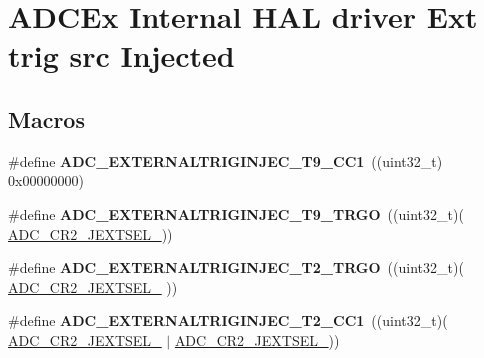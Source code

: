\hypertarget{group___a_d_c_ex___internal___h_a_l__driver___ext__trig__src___injected}{\section{A\-D\-C\-Ex Internal H\-A\-L driver Ext trig src Injected}
\label{group___a_d_c_ex___internal___h_a_l__driver___ext__trig__src___injected}
}
\subsection*{Macros}
\begin{DoxyCompactItemize}
\item 
\hypertarget{group___a_d_c_ex___internal___h_a_l__driver___ext__trig__src___injected_ga105db1d13dd9820bd7e65577433f1f17}{\#define {\bfseries A\-D\-C\-\_\-\-E\-X\-T\-E\-R\-N\-A\-L\-T\-R\-I\-G\-I\-N\-J\-E\-C\-\_\-\-T9\-\_\-\-C\-C1}~((uint32\-\_\-t) 0x00000000)}\label{group___a_d_c_ex___internal___h_a_l__driver___ext__trig__src___injected_ga105db1d13dd9820bd7e65577433f1f17}

\item 
\hypertarget{group___a_d_c_ex___internal___h_a_l__driver___ext__trig__src___injected_ga97742e007b1184da1487baadc14e1475}{\#define {\bfseries A\-D\-C\-\_\-\-E\-X\-T\-E\-R\-N\-A\-L\-T\-R\-I\-G\-I\-N\-J\-E\-C\-\_\-\-T9\-\_\-\-T\-R\-G\-O}~((uint32\-\_\-t)(                                                         \hyperlink{group___peripheral___registers___bits___definition_gaa70c1f30e2101e2177ce564440203ba3}{A\-D\-C\-\_\-\-C\-R2\-\_\-\-J\-E\-X\-T\-S\-E\-L\-\_}))}\label{group___a_d_c_ex___internal___h_a_l__driver___ext__trig__src___injected_ga97742e007b1184da1487baadc14e1475}

\item 
\hypertarget{group___a_d_c_ex___internal___h_a_l__driver___ext__trig__src___injected_gaf55019cfc1f565b459d2969a35d53c30}{\#define {\bfseries A\-D\-C\-\_\-\-E\-X\-T\-E\-R\-N\-A\-L\-T\-R\-I\-G\-I\-N\-J\-E\-C\-\_\-\-T2\-\_\-\-T\-R\-G\-O}~((uint32\-\_\-t)(                                      \hyperlink{group___peripheral___registers___bits___definition_ga99fa4a240d34ce231d6d0543bac7fd9b}{A\-D\-C\-\_\-\-C\-R2\-\_\-\-J\-E\-X\-T\-S\-E\-L\-\_}                   ))}\label{group___a_d_c_ex___internal___h_a_l__driver___ext__trig__src___injected_gaf55019cfc1f565b459d2969a35d53c30}

\item 
\hypertarget{group___a_d_c_ex___internal___h_a_l__driver___ext__trig__src___injected_ga949d65bba1c4763029803fa4a06b0a92}{\#define {\bfseries A\-D\-C\-\_\-\-E\-X\-T\-E\-R\-N\-A\-L\-T\-R\-I\-G\-I\-N\-J\-E\-C\-\_\-\-T2\-\_\-\-C\-C1}~((uint32\-\_\-t)(                                      \hyperlink{group___peripheral___registers___bits___definition_ga99fa4a240d34ce231d6d0543bac7fd9b}{A\-D\-C\-\_\-\-C\-R2\-\_\-\-J\-E\-X\-T\-S\-E\-L\-\_} $\vert$ \hyperlink{group___peripheral___registers___bits___definition_gaa70c1f30e2101e2177ce564440203ba3}{A\-D\-C\-\_\-\-C\-R2\-\_\-\-J\-E\-X\-T\-S\-E\-L\-\_}))}\label{group___a_d_c_ex___internal___h_a_l__driver___ext__trig__src___injected_ga949d65bba1c4763029803fa4a06b0a92}


\end{DoxyCompactItemize}
